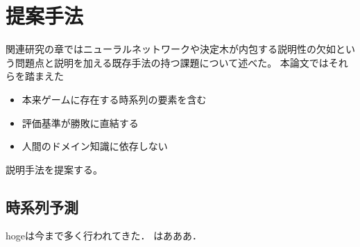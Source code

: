 \chapter{提案手法}
関連研究の章ではニューラルネットワークや決定木が内包する説明性の欠如という問題点と説明を加える既存手法の持つ課題について述べた。
本論文ではそれらを踏まえた
\begin{itemize}
	\item 本来ゲームに存在する時系列の要素を含む
	\item 評価基準が勝敗に直結する
    \item 人間のドメイン知識に依存しない
\end{itemize}
説明手法を提案する。


\section{時系列予測}
hogeは今まで多く行われてきた．
\cite{juang1991hidden}はあああ．